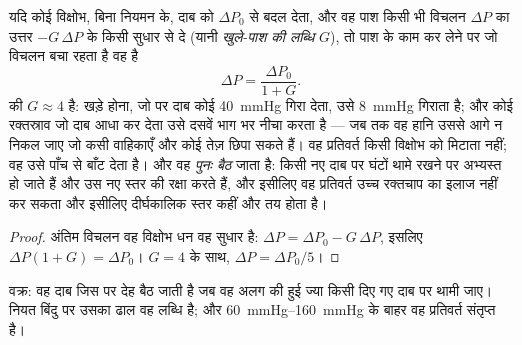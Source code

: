 \begin{theorem}[किसी ऋण प्रतिपुष्टि पाश की लब्धि]\label{thm:b2:blood-pressure:gain}
यदि कोई विक्षोभ, बिना नियमन के, दाब को
$\Delta P_0$ से बदल देता, और वह पाश किसी भी विचलन $\Delta P$ का उत्तर
$-G\,\Delta P$ के किसी सुधार से दे (यानी \emph{खुले-पाश की लब्धि} $G$), तो
पाश के काम कर लेने पर जो विचलन बचा रहता है वह है
\[
\Delta P = \frac{\Delta P_0}{1 + G}.
\]
 की $G \approx 4$ है: खड़े होना, जो
 पर दाब कोई \qty{40}{mmHg} गिरा देता, उसे
\qty{8}{mmHg} गिराता है; और कोई रक्तस्राव जो दाब आधा कर देता उसे
दसवें भाग भर नीचा करता है --- जब तक वह हानि उससे आगे न निकल जाए जो कसी वाहिकाएँ और कोई
तेज़  छिपा सकते हैं। वह प्रतिवर्त किसी विक्षोभ को मिटाता नहीं;
वह उसे पाँच से बाँट देता है। और वह \emph{पुनः बैठ} जाता है: किसी नए दाब पर
घंटों थामे रखने पर  अभ्यस्त हो जाते हैं और उस नए स्तर की रक्षा करते हैं, और
इसीलिए वह प्रतिवर्त उच्च रक्तचाप का इलाज नहीं कर सकता और इसीलिए दीर्घकालिक
स्तर कहीं और तय होता है।
\end{theorem}
\begin{proof}
अंतिम विचलन वह विक्षोभ धन वह सुधार है:
$\Delta P = \Delta P_0 - G\,\Delta P$, इसलिए $\Delta P(1 + G) =
\Delta P_0$। $G = 4$ के साथ, $\Delta P = \Delta P_0/5$।
\end{proof}

\begin{omfigure}

{\small {} वक्र: वह दाब जिस पर देह बैठ जाती है जब
वह अलग की हुई ज्या किसी दिए गए दाब पर थामी जाए। नियत बिंदु पर उसका
ढाल वह लब्धि है; और \qtyrange{60}{160}{mmHg} के बाहर वह प्रतिवर्त
संतृप्त है।}
\end{omfigure}

